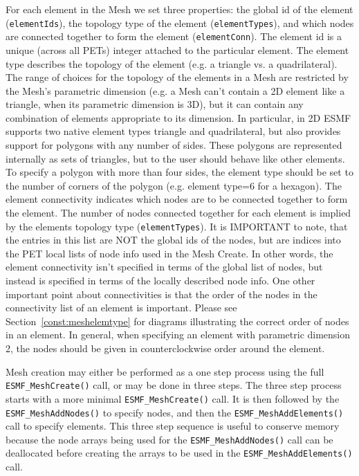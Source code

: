    For each element in the Mesh we set three properties: the global id of the element ({\tt elementIds}), the topology type of
   the element ({\tt elementTypes}), and which nodes are connected together to form the element ({\tt elementConn}). The element id is
   a unique (across all PETs) integer attached to the particular element. The element type describes the topology of the element 
   (e.g. a triangle vs. a quadrilateral). The range of choices for the topology of the elements in a Mesh are restricted by the 
   Mesh's parametric dimension (e.g. a Mesh can't contain a 2D element like a triangle, when its parametric dimension is 3D), but it can contain
   any combination of elements appropriate to its dimension. In particular, in 2D ESMF supports two native element types triangle and quadrilateral, but
   also provides support for polygons with any number of sides. These polygons are represented internally as sets of triangles, but to the user
   should behave like other elements. To specify a polygon with more than four sides, the element type should be set to the number of corners of 
   the polygon (e.g. element type=6 for a hexagon). 
   The element connectivity indicates which nodes are to be connected together to
   form the element. The number of nodes connected together for each element is implied by the elements topology type ({\tt elementTypes}). 
   It is IMPORTANT to note, that the entries in this list are NOT the global ids of the nodes, but are indices into the PET local lists of
   node info used in the Mesh Create. In other words, the element connectivity isn't specified in terms of the global list of nodes, but instead
   is specified in terms of the locally described node info. One other important point about connectivities is that the order of the nodes in the 
   connectivity list of an element is important. Please see Section~\ref{const:meshelemtype} for diagrams illustrating the correct order of
   nodes in an element. In general, when specifying an element with parametric dimension 2, the nodes should be given in counterclockwise order
   around the element. 
  
   \begin{sloppypar}
   Mesh creation may either be performed as a one step process using the full {\tt ESMF\_MeshCreate()} call, or may be done in three steps. The
   three step process starts with a more minimal {\tt ESMF\_MeshCreate()} call. It is then followed by the {\tt ESMF\_MeshAddNodes()} to 
   specify nodes, and then the {\tt ESMF\_MeshAddElements()} call to specify elements. This three step sequence is useful to conserve memory
   because the node arrays being used for the {\tt ESMF\_MeshAddNodes()} call can be deallocated before creating the arrays to be used in the {\tt ESMF\_MeshAddElements()} call.
   \end{sloppypar}
   
